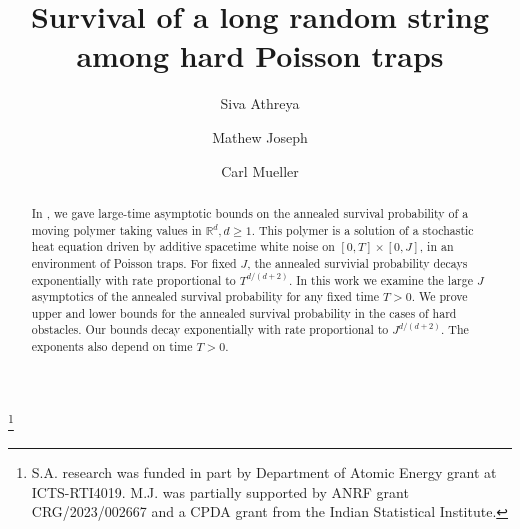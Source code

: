 \documentclass[12pt]{amsart}
\numberwithin{equation}{section}
\theoremstyle{definition}
\numberwithin{equation}{section}
\newcommand{\R}{\mathbb{R}}
\begin{document}
\title[]{Survival of a long random string among hard Poisson traps}
\author{Siva Athreya \and Mathew Joseph \and Carl Mueller}
\address{Siva Athreya\\ International centre for theoretical Sciences\\Survey No. 151, Shivakote,\\
Hesaraghatta Hobli,\\ Bengaluru - 560 089 } 

\address{Mathew Joseph\\ Statmath Unit\\ Indian Statistical Institute\\ 8th Mile Mysore Road\\ Bangalore 560059
} 

\address{Carl Mueller \\Department of Mathematics, University of Rochester, Rochester, NY  14627
}

\thanks{S.A. research was funded in part by Department of Atomic Energy grant at  ICTS-RTI4019. M.J. was partially supported by ANRF grant CRG/2023/002667 and a CPDA grant from the Indian Statistical Institute.}





\begin{abstract} 
In \cite{ajm23}, we gave large-time asymptotic bounds on 
the annealed survival probability of a moving polymer taking values in 
$\R^d, d \geq 1$.   This polymer is a solution of a stochastic heat 
equation driven by additive spacetime white noise on $[0,T] \times [0,J]$, 
in an environment of Poisson traps.  For fixed $J$, the annealed survivial 
probability decays exponentially with rate proportional to $T^{d/(d+2)}$. 
In this work we examine the large $J$ asymptotics of the annealed survival 
probability for any fixed time $T>0$. We prove upper and lower bounds for 
the annealed survival probability in the cases of hard obstacles. Our 
bounds decay exponentially with rate proportional to $J^{d/(d+2)}$. The 
exponents also depend on time  $T >0$. 
\end{abstract} 


\maketitle
\end{document}
